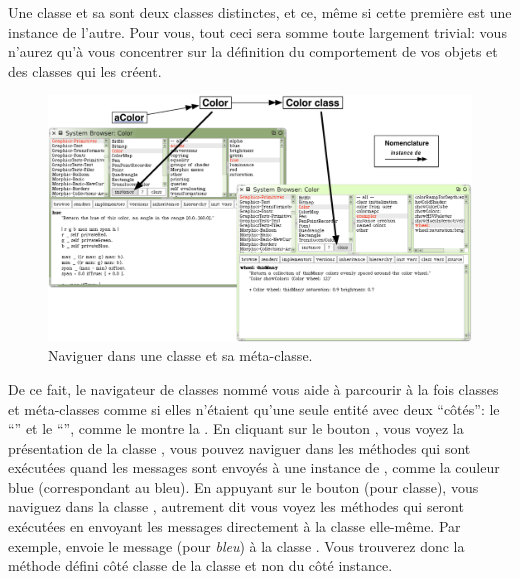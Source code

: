 \documentclass[a4paper,10pt,twoside]{book}
\begin{document}
Une classe et sa  sont deux classes distinctes, et ce, m\^eme si cette premi\`ere est une instance de l'autre. Pour vous, tout ceci sera somme toute largement trivial: vous n'aurez qu'\`a vous concentrer sur la d\'efinition du comportement de vos objets et des classes qui les cr\'eent.

\begin{figure}[htb]
\begin{center}
\includegraphics[width=\textwidth]{Color-Buttons}
\caption{Naviguer dans une classe et sa m\'eta-classe.
\label{fig:Buttons}}
\end{center}
\end{figure}

De ce fait, le navigateur de classes nomm\'e  vous
aide \`a parcourir \`a la fois classes et m\'eta-classes comme si elles
n'\'etaient qu'une seule entit\'e avec deux ``c\^ot\'es'': le ``'' et le ``'', comme le montre la . 
En cliquant sur le 
bouton , vous voyez la pr\'esentation de la classe , \ie vous pouvez naviguer dans les m\'ethodes qui sont ex\'ecut\'ees quand
les messages sont envoy\'es \`a une instance de
, comme la couleur blue (correspondant au bleu). En appuyant
sur le bouton  (pour classe), vous naviguez dans la classe , autrement dit vous voyez les m\'ethodes qui seront ex\'ecut\'ees
en envoyant les messages directement \`a la classe  elle-m\^eme.
Par exemple,  envoie le message  (pour \emph{bleu}) \`a
la classe .
Vous trouverez donc la m\'ethode  d\'efini c\^ot\'e classe de la classe  et non du c\^ot\'e instance.
\end{document}
